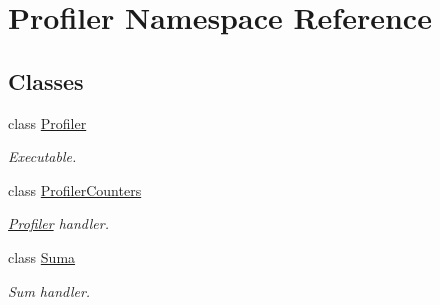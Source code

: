 \hypertarget{namespaceProfiler}{}\section{Profiler Namespace Reference}
\label{namespaceProfiler}
\subsection*{Classes}
\begin{DoxyCompactItemize}
\item 
class \hyperlink{classProfiler_1_1Profiler}{Profiler}
\begin{DoxyCompactList}\small\item\em Executable. \end{DoxyCompactList}\item 
class \hyperlink{classProfiler_1_1ProfilerCounters}{Profiler\+Counters}
\begin{DoxyCompactList}\small\item\em \hyperlink{classProfiler_1_1Profiler}{Profiler} handler. \end{DoxyCompactList}\item 
class \hyperlink{classProfiler_1_1Suma}{Suma}
\begin{DoxyCompactList}\small\item\em Sum handler. \end{DoxyCompactList}\end{DoxyCompactItemize}
